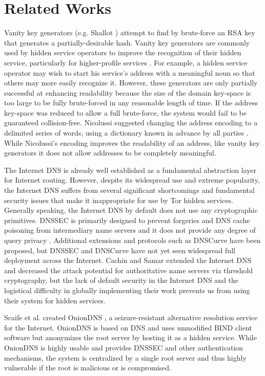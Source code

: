 \documentclass[USenglish,oneside,twocolumn]{article}
\begin{document}
\section{Related Works}
\label{sec:RelatedWorks}

Vanity key generators (e.g. Shallot \cite{KatmagicShallot}) attempt to find by brute-force an RSA key that generates a partially-desirable hash. Vanity key generators are commonly used by hidden service operators to improve the recognition of their hidden service, particularly for higher-profile services \cite{syversongenuine}. For example, a hidden service operator may wish to start his service's address with a meaningful noun so that others may more easily recognize it. However, these generators are only partially successful at enhancing readability because the size of the domain key-space is too large to be fully brute-forced in any reasonable length of time. If the address key-space was reduced to allow a full brute-force, the system would fail to be guaranteed collision-free. Nicolussi suggested changing the address encoding to a delimited series of words, using a dictionary known in advance by all parties \cite{nicolussi2011human}. While Nicolussi's encoding improves the readability of an address, like vanity key generators it does not allow addresses to be completely meaningful.

The Internet DNS is already well established as a fundamental abstraction layer for Internet routing. However, despite its widespread use and extreme popularity, the Internet DNS suffers from several significant shortcomings and fundamental security issues that make it inappropriate for use by Tor hidden services. Generally speaking, the Internet DNS by default does not use any cryptographic primitives. DNSSEC is primarily designed to prevent forgeries and DNS cache poisoning from intermediary name servers and it does not provide any degree of query privacy \cite{wachs2014censorship}. Additional extensions and protocols such as DNSCurve \cite{bernstein2009dnscurve} have been proposed, but DNSSEC and DNSCurve have not yet seen widespread full deployment across the Internet. Cachin and Samar \cite{cachin2004secure} extended the Internet DNS and decreased the attack potential for authoritative name servers via threshold cryptography, but the lack of default security in the Internet DNS and the logistical difficulty in globally implementing their work prevents us from using their system for hidden services.

Scaife et al. created OnionDNS \cite{Scaife2015oniondns}, a seizure-resistant alternative resolution service for the Internet. OnionDNS is based on DNS and uses unmodified BIND client software but anonymizes the root server by hosting it as a hidden service. While OnionDNS is highly usable and provides DNSSEC and other authentication mechanisms, the system is centralized by a single root server and thus highly vulnerable if the root is malicious or is compromised.
\end{document}

